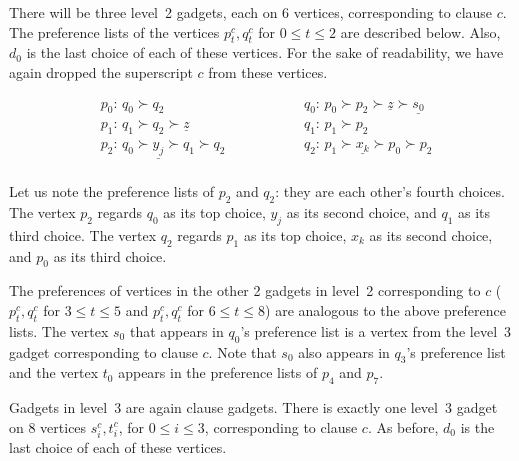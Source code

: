 \documentclass{llncs}
\begin{document}
There will be three level~2 gadgets, each on 6 vertices, corresponding to clause $c$.
The preference lists of the vertices $p^c_t,q^c_t$ for $0 \le t \le 2$ are described below.
Also, $d_0$ is the last choice of each of these vertices.
For the sake of readability, we have again dropped the superscript $c$ from these
vertices. 

\begin{minipage}[c]{0.45\textwidth}
			
			\centering
			\begin{align*}
			        &p_0\colon \, q_0 \succ q_2  \qquad\qquad && q_0\colon \, p_0 \succ p_2 \succ \underline{z} \succ \underline{s_0}\\
                                &p_1\colon \, q_1 \succ q_2 \succ \underline{z}  \qquad\qquad && q_1\colon \, p_1 \succ p_2 \\
                                &p_2\colon \, q_0 \succ \underline{y_j} \succ q_1 \succ q_2  \qquad\qquad && q_2\colon \, p_1 \succ \underline{x_k} \succ p_0 \succ p_2 \\
			\end{align*}
\end{minipage}




Let us note the preference lists of $p_2$ and $q_2$:
they are each other's fourth choices.
The vertex $p_2$ regards $q_0$ as its top choice, $y_j$ as its second choice, and $q_1$ as its third choice.
The vertex $q_2$ regards $p_1$ as its top choice, $x_k$ as its second choice, and $p_0$ as its third choice.

The preferences of vertices in the other 2 gadgets in level~2 corresponding to $c$ ($p^c_t,q^c_t$ for $3 \le t \le 5$ and
$p^c_t,q^c_t$ for $6 \le t \le 8$) are analogous to the above preference lists.
The vertex $s_0$ that appears in $q_0$'s preference list is a vertex from the level~3 gadget corresponding to clause $c$.
Note that  $s_0$ also appears in $q_3$'s preference list and the vertex $t_0$ appears in the preference lists of $p_4$ and $p_7$.

\medskip

Gadgets in level~3 are again clause gadgets. There is exactly one level~3 gadget on 8 vertices $s^c_i,t^c_i$, for $0 \le i \le 3$,
corresponding to clause $c$.  As before, $d_0$ is the last choice of each of these vertices.
\end{document}
